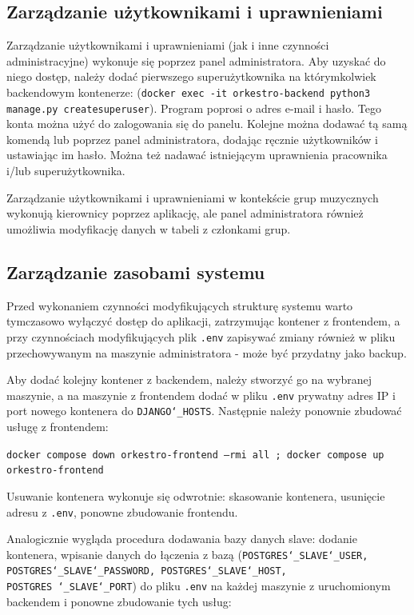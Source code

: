 \documentclass[11pt,a4paper]{article}
\renewcommand{\_}{\char`_}
\begin{document}
\subsection{Zarządzanie użytkownikami i uprawnieniami}

Zarządzanie użytkownikami i uprawnieniami (jak i inne czynności administracyjne) wykonuje się poprzez panel administratora. Aby uzyskać do niego dostęp, należy dodać pierwszego superużytkownika na którymkolwiek backendowym kontenerze: (\texttt{docker exec -it orkestro-backend python3 manage.py createsuperuser}). Program poprosi o adres e-mail i hasło. Tego konta można użyć do zalogowania się do panelu. Kolejne można dodawać tą samą komendą lub poprzez panel administratora, dodając ręcznie użytkowników i ustawiając im hasło. Można też nadawać istniejącym uprawnienia pracownika i/lub superużytkownika.

Zarządzanie użytkownikami i uprawnieniami w kontekście grup muzycznych wykonują kierownicy poprzez aplikację, ale panel administratora również umożliwia modyfikację danych w tabeli z członkami grup.

\subsection{Zarządzanie zasobami systemu}

Przed wykonaniem czynności modyfikujących strukturę systemu warto tymczasowo wyłączyć dostęp do aplikacji, zatrzymując kontener z frontendem, a przy czynnościach modyfikujących plik \texttt{.env} zapisywać zmiany również w pliku przechowywanym na maszynie administratora - może być przydatny jako backup.

Aby dodać kolejny kontener z backendem, należy stworzyć go na wybranej maszynie, a na maszynie z frontendem dodać w pliku \texttt{.env} prywatny adres IP i port nowego kontenera do \texttt{DJANGO\_HOSTS}. Następnie należy ponownie zbudować usługę z frontendem:

\texttt{docker compose down orkestro-frontend --rmi all ; docker compose up orkestro-frontend}

Usuwanie kontenera wykonuje się odwrotnie: skasowanie kontenera, usunięcie adresu z \texttt{.env}, ponowne zbudowanie frontendu.

Analogicznie wygląda procedura dodawania bazy danych slave: dodanie kontenera, wpisanie danych do łączenia z bazą (\texttt{POSTGRES\_SLAVE\_USER, POSTGRES\_SLAVE\_PASSWORD, POSTGRES\_SLAVE\_HOST, POSTGRES\ \_SLAVE\_PORT}) do pliku \texttt{.env} na każdej maszynie z uruchomionym backendem i ponowne zbudowanie tych usług:
\end{document}
